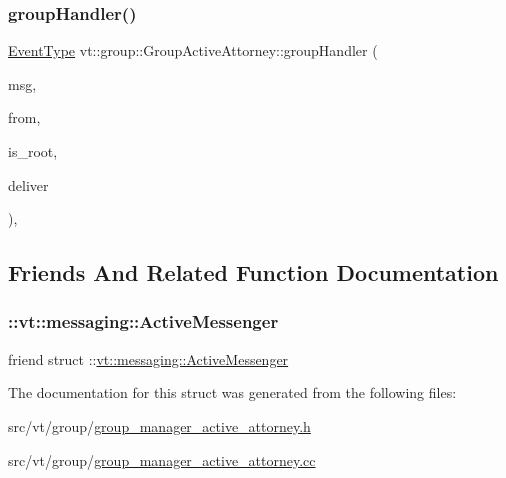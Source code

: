 \subsubsection{\texorpdfstring{group\+Handler()}{groupHandler()}}
{\footnotesize\ttfamily \hyperlink{namespacevt_a009267401def7ae8bf201892222d060f}{Event\+Type} vt\+::group\+::\+Group\+Active\+Attorney\+::group\+Handler (\begin{DoxyParamCaption}\item[{\hyperlink{namespacevt_ab2b3d506ec8e8d1540aede826d84a239}{Msg\+Shared\+Ptr}$<$ \hyperlink{namespacevt_a44d0d4e144748f2b19a1cfd962f50338}{Base\+Msg\+Type} $>$ const \&}]{msg,  }\item[{\hyperlink{namespacevt_a866da9d0efc19c0a1ce79e9e492f47e2}{Node\+Type} const \&}]{from,  }\item[{bool const}]{is\+\_\+root,  }\item[{bool $\ast$const}]{deliver }\end{DoxyParamCaption})\hspace{0.3cm}{\ttfamily [static]}, {\ttfamily [private]}}



\subsection{Friends And Related Function Documentation}
\mbox{\label{structvt_1_1group_1_1_group_active_attorney_a31cb499e12b002c0912506ddca0efcaa}} 
\subsubsection{\texorpdfstring{\+::vt\+::messaging\+::\+Active\+Messenger}{::vt::messaging::ActiveMessenger}}
{\footnotesize\ttfamily friend struct \+::\hyperlink{structvt_1_1messaging_1_1_active_messenger}{vt\+::messaging\+::\+Active\+Messenger}\hspace{0.3cm}{\ttfamily [friend]}}



The documentation for this struct was generated from the following files\+:\begin{DoxyCompactItemize}
\item 
src/vt/group/\hyperlink{group__manager__active__attorney_8h}{group\+\_\+manager\+\_\+active\+\_\+attorney.\+h}\item 
src/vt/group/\hyperlink{group__manager__active__attorney_8cc}{group\+\_\+manager\+\_\+active\+\_\+attorney.\+cc}\end{DoxyCompactItemize}

